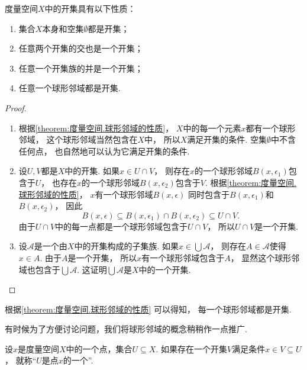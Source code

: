 \begin{theorem}\label{theorem:度量空间.开集的性质}
度量空间\(X\)中的开集具有以下性质：
\begin{enumerate}
	\item 集合\(X\)本身和空集\(\emptyset\)都是开集；
	\item 任意两个开集的交也是一个开集；
	\item 任意一个开集族的并是一个开集；
	\item 任意一个球形邻域都是开集.
\end{enumerate}
\begin{proof}
\begin{enumerate}
	\item 根据\cref{theorem:度量空间.球形邻域的性质}，
	\(X\)中的每一个元素\(x\)都有一个球形邻域，
	这个球形邻域当然包含在\(X\)中，
	所以\(X\)满足开集的条件.
	空集\(\emptyset\)中不含任何点，
	也自然地可以认为它满足开集的条件.

	\item 设\(U,V\)都是\(X\)中的开集.
	如果\(x \in U \cap V\)，
	则存在\(x\)的一个球形邻域\(B(x,\epsilon_1)\)包含于\(U\)，
	也存在\(x\)的一个球形邻域\(B(x,\epsilon_2)\)包含于\(V\).
	根据\cref{theorem:度量空间.球形邻域的性质}，
	\(x\)有一个球形邻域\(B(x,\epsilon)\)
	同时包含于\(B(x,\epsilon_1)\)和\(B(x,\epsilon_2)\)，
	因此\[
		B(x,\epsilon)
		\subseteq
		B(x,\epsilon_1) \cap B(x,\epsilon_2)
		\subseteq
		U \cap V.
	\]
	由于\(U \cap V\)中的每一点都是一个球形邻域包含于\(U \cap V\)，
	所以\(U \cap V\)是一个开集.

	\item 设\(\mathscr{A}\)是一个由\(X\)中的开集构成的子集族.
	如果\(x \in \bigcup \mathscr{A}\)，
	则存在\(A \in \mathscr{A}\)使得\(x \in A\).
	由于\(A\)是一个开集，
	所以\(x\)有一个球形邻域包含于\(A\)，
	显然这个球形邻域也包含于\(\bigcup \mathscr{A}\).
	这证明\(\bigcup \mathscr{A}\)是\(X\)中的一个开集.
	\qedhere
\end{enumerate}
\end{proof}
\end{theorem}

根据\cref{theorem:度量空间.球形邻域的性质} 可以得知，
每一个球形邻域都是开集.

有时候为了方便讨论问题，我们将球形邻域的概念稍稍作一点推广.
\begin{definition}\label{definition:度量空间.邻域的概念}
设\(x\)是度量空间\(X\)中的一个点，集合\(U \subseteq X\).
如果存在一个开集\(V\)满足条件\(x \in V \subseteq U\)，
就称“\(U\)是点\(x\)的一个”.
\end{definition}

